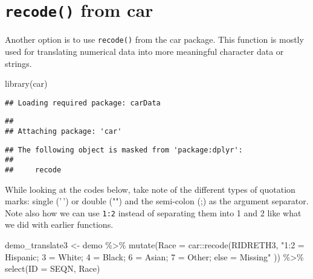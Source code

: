 \documentclass[
]{book}
\newenvironment{Shaded}{\begin{snugshade}}{\end{snugshade}}
\newcommand{\AttributeTok}[1]{\textcolor[rgb]{0.77,0.63,0.00}{#1}}
\newcommand{\FunctionTok}[1]{\textcolor[rgb]{0.00,0.00,0.00}{#1}}
\newcommand{\NormalTok}[1]{#1}
\newcommand{\OtherTok}[1]{\textcolor[rgb]{0.56,0.35,0.01}{#1}}
\newcommand{\SpecialCharTok}[1]{\textcolor[rgb]{0.00,0.00,0.00}{#1}}
\newcommand{\StringTok}[1]{\textcolor[rgb]{0.31,0.60,0.02}{#1}}
\begin{document}
\hypertarget{recode-from-car}{%
\section{\texorpdfstring{\texttt{recode()} from car}{recode() from car}}\label{recode-from-car}}

Another option is to use \texttt{recode()} from the car package. This function is mostly used for translating numerical data into more meaningful character data or strings.

\begin{Shaded}
\begin{Highlighting}[]
\FunctionTok{library}\NormalTok{(car)}
\end{Highlighting}
\end{Shaded}

\begin{verbatim}
## Loading required package: carData
\end{verbatim}

\begin{verbatim}
## 
## Attaching package: 'car'
\end{verbatim}

\begin{verbatim}
## The following object is masked from 'package:dplyr':
## 
##     recode
\end{verbatim}

While looking at the codes below, take note of the different types of quotation marks: single ('\,') or double ("") and the semi-colon (;) as the argument separator. Note also how we can use \texttt{1:2} instead of separating them into 1 and 2 like what we did with earlier functions.

\begin{Shaded}
\begin{Highlighting}[]
\NormalTok{demo\_translate3 }\OtherTok{\textless{}{-}}\NormalTok{ demo }\SpecialCharTok{\%\textgreater{}\%}
    \FunctionTok{mutate}\NormalTok{(}\AttributeTok{Race =}\NormalTok{ car}\SpecialCharTok{::}\FunctionTok{recode}\NormalTok{(RIDRETH3,}
        \StringTok{"1:2 = \textquotesingle{}Hispanic\textquotesingle{};}
\StringTok{         3 = \textquotesingle{}White\textquotesingle{};}
\StringTok{         4 = \textquotesingle{}Black\textquotesingle{};}
\StringTok{         6 = \textquotesingle{}Asian\textquotesingle{};}
\StringTok{         7 = \textquotesingle{}Other\textquotesingle{};}
\StringTok{         else = \textquotesingle{}Missing\textquotesingle{}"}
\NormalTok{    )) }\SpecialCharTok{\%\textgreater{}\%}
    \FunctionTok{select}\NormalTok{(}\AttributeTok{ID =}\NormalTok{ SEQN, Race)}
\end{Highlighting}
\end{Shaded}
\end{document}
